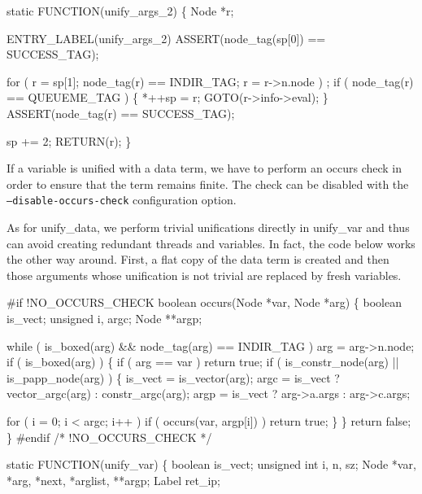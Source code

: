 static
FUNCTION(unify_args_2)
\{
    Node *r;

 ENTRY_LABEL(unify_args_2)
    ASSERT(node_tag(sp[0]) == SUCCESS_TAG);

    for ( r = sp[1]; node_tag(r) == INDIR_TAG; r = r->n.node )
        ;
    if ( node_tag(r) == QUEUEME_TAG )
    \{
        *++sp = r;
        GOTO(r->info->eval);
    \}
    ASSERT(node_tag(r) == SUCCESS_TAG);

    sp += 2;
    RETURN(r);
\}

\nwendcode{}\nwdocspar
If a variable is unified with a data term, we have to perform an
occurs check in order to ensure that the term remains finite. The
check can be disabled with the \texttt{--disable-occurs-check}
configuration option.

As for {\Tt{}unify{\_}data\nwendquote}, we perform trivial unifications directly in
{\Tt{}unify{\_}var\nwendquote} and thus can avoid creating redundant threads and
variables. In fact, the code below works the other way around. First,
a flat copy of the data term is created and then those arguments whose
unification is not trivial are replaced by fresh variables.


\nwenddocs{}\plusendmoddef\nwstartdeflinemarkup{}\nwenddeflinemarkup
#if !NO_OCCURS_CHECK
boolean
occurs(Node *var, Node *arg)
\{
    boolean  is_vect;
    unsigned i, argc;
    Node     **argp;

    while ( is_boxed(arg) && node_tag(arg) == INDIR_TAG )
        arg = arg->n.node;
    if ( is_boxed(arg) )
    \{
        if ( arg == var )
            return true;
        if ( is_constr_node(arg) || is_papp_node(arg) )
        \{
            is_vect = is_vector(arg);
            argc    = is_vect ? vector_argc(arg) : constr_argc(arg);
            argp    = is_vect ? arg->a.args : arg->c.args;

            for ( i = 0; i < argc; i++ )
                if ( occurs(var, argp[i]) )
                    return true;
        \}
    \}
    return false;
\}
#endif /* !NO_OCCURS_CHECK */

static
FUNCTION(unify_var)
\{
    boolean      is_vect;
    unsigned int i, n, sz;
    Node         *var, *arg, *next, *arglist, **argp;
    Label        ret_ip;

